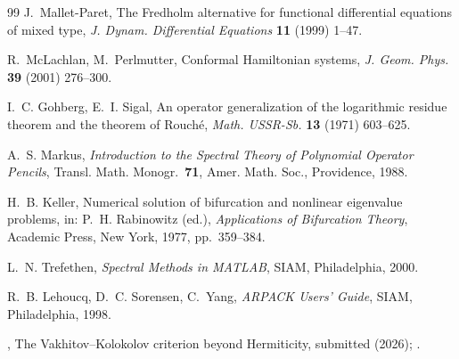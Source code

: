 \documentclass[11pt]{article}
\theoremstyle{plain}
\theoremstyle{definition}
\theoremstyle{remark}
\begin{document}
\begin{thebibliography}{99}
J.~Mallet-Paret,
The Fredholm alternative for functional differential equations of mixed type,
\emph{J. Dynam. Differential Equations} \textbf{11} (1999) 1--47.

R.~McLachlan, M.~Perlmutter,
Conformal Hamiltonian systems,
\emph{J. Geom. Phys.} \textbf{39} (2001) 276--300.

I.~C. Gohberg, E.~I. Sigal,
An operator generalization of the logarithmic residue theorem and the theorem of
Rouch\'e,
\emph{Math. USSR-Sb.} \textbf{13} (1971) 603--625.

A.~S. Markus,
\emph{Introduction to the Spectral Theory of Polynomial Operator Pencils},
Transl. Math. Monogr.\ \textbf{71}, Amer. Math. Soc., Providence, 1988.

H.~B. Keller,
Numerical solution of bifurcation and nonlinear eigenvalue problems,
in: P.~H. Rabinowitz (ed.), \emph{Applications of Bifurcation Theory},
Academic Press, New York, 1977, pp.~359--384.

L.~N. Trefethen,
\emph{Spectral Methods in MATLAB}, SIAM, Philadelphia, 2000.

R.~B. Lehoucq, D.~C. Sorensen, C.~Yang,
\emph{ARPACK Users' Guide}, SIAM, Philadelphia, 1998.

\NoteAuthor,
The Vakhitov--Kolokolov criterion beyond Hermiticity,
submitted (2026); \VKarXiv.

\end{thebibliography}
\end{document}
